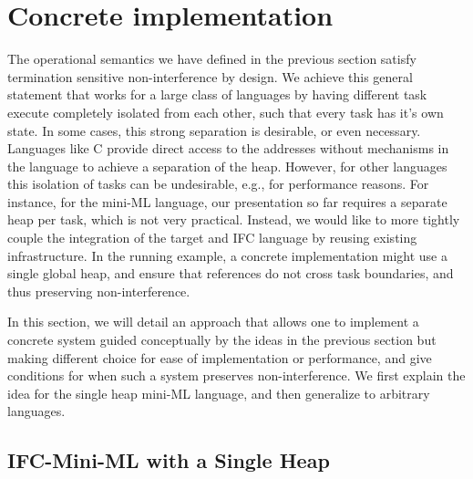 \section{Concrete implementation}
\label{sec:concrete}

\newcommand{\con}[1]{\ensuremath{{\color{red} #1}}}
\newcommand{\abs}[1]{\ensuremath{{\color{blue} #1}}}


The operational semantics we have defined in the previous section
satisfy termination sensitive non-interference by design.
We achieve this general statement that works for a large class of
languages by having different task execute completely isolated from
each other, such that every task has it's own state.
In some cases, this strong separation is desirable, or even necessary.
Languages like C provide direct access to the addresses without
mechanisms in the language to achieve a separation of the heap.
However, for other languages this isolation of tasks can be
undesirable, e.g., for performance reasons.
For instance, for the mini-ML language, our presentation so far
requires a separate heap per task, which is not very practical.
Instead, we would like to
more tightly couple the integration of the target and IFC
language by reusing existing infrastructure.  In the running example,
a concrete implementation might use a single global heap, and ensure
that references do not cross task boundaries, and thus preserving
non-interference.

In this section, we will detail an approach that allows one to implement
a concrete system guided conceptually by the ideas in the previous
section but making different choice for ease of implementation or
performance, and give conditions for when such a system preserves
non-interference.
We first explain the idea for the single heap mini-ML language, and then
generalize to arbitrary languages.

\subsection{IFC-Mini-ML with a Single Heap}

